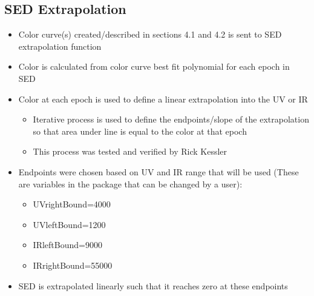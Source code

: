 \subsection{SED Extrapolation}
\begin{itemize}
\item Color curve(s) created/described in sections 4.1 and 4.2 is sent to SED extrapolation function
\item Color is calculated from color curve best fit polynomial for each epoch in SED
\item Color at each epoch is used to define a linear extrapolation into the UV or IR
\begin{itemize}
\item Iterative process is used to define the endpoints/slope of the extrapolation so that area under line is equal to the color at that epoch
\item This process was tested and verified by Rick Kessler
\end{itemize}
\item Endpoints were chosen based on UV and IR range that will be used (These are variables in the package that can be changed by a user):
\begin{itemize}
\item UVrightBound=4000
\item UVleftBound=1200
\item IRleftBound=9000
\item IRrightBound=55000
\end{itemize}
\item SED is extrapolated linearly such that it reaches zero at these endpoints
\end{itemize}
\


